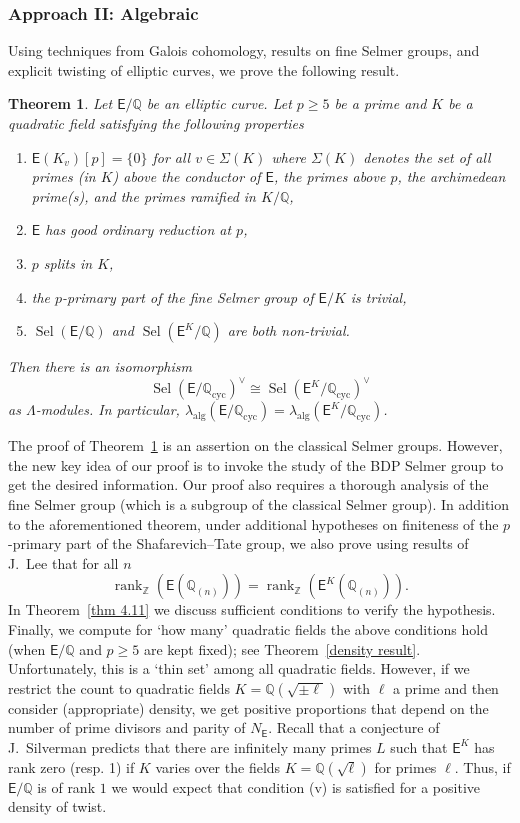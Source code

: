 \documentclass{amsart}
\numberwithin{equation}{section}
\newtheorem{lthm}{Theorem}
\theoremstyle{remark}
\newcommand{\cyc}{\operatorname{cyc}}
\newcommand{\Sel}{\operatorname{Sel}}
\newcommand{\rk}{\operatorname{rank}}
\newcommand{\alg}{\operatorname{alg}}
\newcommand{\Z}{\mathbb{Z}}
\newcommand{\Q}{\mathbb{Q}}
\newcommand{\EC}{\mathsf{E}}
\theoremstyle{plain} %
\begin{document}
\subsubsection*{Approach II: Algebraic}

Using techniques from Galois cohomology, results on fine Selmer groups, and explicit twisting of elliptic curves, we prove the following result.

\begin{lthm}
\label{thm B}
Let $\EC/\Q$ be an elliptic curve.
Let $p\geq 5$ be a prime and $K$ be a quadratic field satisfying the following properties
    \begin{enumerate}
    \item[\textup{(}i\textup{)}] $\EC(K_v)[p]=\{0\}$ for all $v\in \Sigma(K)$ where $\Sigma(K)$ denotes the set of all primes (in $K$) above the conductor of $\EC$, the primes above $p$, the archimedean prime(s), and the primes ramified in $K/\Q$,
    \item[\textup{(}ii\textup{)}] $\EC$ has good ordinary reduction at $p$,
    \item[\textup{(}iii\textup{)}] $p$ splits in $K$,
    \item[\textup{(}iv\textup{)}] the $p$-primary part of the fine Selmer group of $\EC/K$ is trivial,
    \item[\textup{(}v\textup{)}] $\Sel(\EC/\Q)$ and $\Sel(\EC^K/\Q)$ are both non-trivial.
\end{enumerate}
Then there is an isomorphism
\[
\Sel(\EC/\Q_{\cyc})^\vee\cong \Sel(\EC^K/\Q_{\cyc})^\vee
\]
as $\Lambda$-modules.
In particular, $\lambda_{\alg}(\EC/\Q_{\cyc}) = \lambda_{\alg}(\EC^{K}/\Q_{\cyc})$.
\end{lthm}


The proof of Theorem~\ref{thm B} is an assertion on the classical Selmer groups.
However, the new key idea of our proof is to invoke the study of the BDP Selmer group to get the desired information.
Our proof also requires a thorough analysis of the fine Selmer group (which is a subgroup of the classical Selmer group).
In addition to the aforementioned theorem, under additional hypotheses on finiteness of the $p$-primary part of the Shafarevich--Tate group, we also prove using results of J.~Lee that for all $n$
\[
\rk_{\Z}(\EC(\Q_{(n)}))=\rk_{\Z}(\EC^K(\Q_{(n)})).
\]
In Theorem~\ref{thm 4.11} we discuss sufficient conditions to verify the hypothesis.
Finally,  we compute for `how many' quadratic fields the above conditions hold (when $\EC/\Q$ and $p\geq 5$ are kept fixed); see Theorem~\ref{density result}.
Unfortunately, this is a `thin set' among all quadratic fields.
However, if we restrict the count to quadratic fields $K = \Q(\sqrt{\pm \ell})$ with $\ell$ a prime and then consider (appropriate) density, we get positive proportions that depend on the number of prime divisors and parity of $N_{\EC}$.
Recall that a conjecture of J.~Silverman predicts that there are infinitely many primes $L$ such that $\EC^K$ has rank zero (resp. 1) if $K$ varies over the fields $K=\Q(\sqrt{\ell})$ for primes $\ell$.
Thus, if $\EC/\Q$ is of rank $1$ we would expect that condition (v) is satisfied for a positive density of twist.
\end{document}
